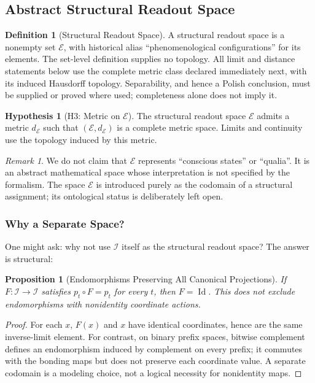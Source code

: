 \documentclass[11pt,a4paper]{article}
\theoremstyle{plain}
\newtheorem{proposition}[theorem]{Proposition}
\theoremstyle{definition}
\newtheorem{definition}[theorem]{Definition}
\newtheorem{hypothesis}[theorem]{Hypothesis}
\theoremstyle{remark}
\newtheorem{remark}[theorem]{Remark}
\begin{document}
\subsection{Abstract Structural Readout Space}

\begin{definition}[Structural Readout Space]\label{def:phenspace}
A structural readout space is a nonempty set $\mathcal E$, with historical
alias ``phenomenological configurations'' for its elements. The set-level
definition supplies no topology. All limit and distance statements below
use the complete metric class declared immediately next, with its induced
Hausdorff topology. Separability, and hence a Polish conclusion, must be
supplied or proved where used; completeness alone does not imply it.
\end{definition}

\begin{hypothesis}[H3: Metric on $\mathcal{E}$]\label{hyp:h3}
The structural readout space $\mathcal{E}$ admits a metric $d_\mathcal{E}$ such that $(\mathcal{E}, d_\mathcal{E})$ is a complete metric space.
Limits and continuity use the topology induced by this metric.
\end{hypothesis}

\begin{remark}
We do not claim that $\mathcal{E}$ represents ``conscious states'' or ``qualia''. It is an abstract mathematical space whose interpretation is not specified by the formalism. The space $\mathcal{E}$ is introduced purely as the codomain of a structural assignment; its ontological status is deliberately left open.
\end{remark}

\subsubsection{Why a Separate Space?}

One might ask: why not use $\mathcal{I}$ itself as the structural readout space? The answer is structural:

\begin{proposition}[Endomorphisms Preserving All Canonical Projections]
If $F:\mathcal I\to\mathcal I$ satisfies $p_t\circ F=p_t$ for every $t$, then $F=\operatorname{Id}$. This does not exclude endomorphisms with nonidentity coordinate actions.
\end{proposition}

\begin{proof}
For each $x$, $F(x)$ and $x$ have identical coordinates, hence are the same inverse-limit element. For contrast, on binary prefix spaces, bitwise complement defines an endomorphism induced by complement on every prefix; it commutes with the bonding maps but does not preserve each coordinate value. A separate codomain is a modeling choice, not a logical necessity for nonidentity maps.
\end{proof}
\end{document}

